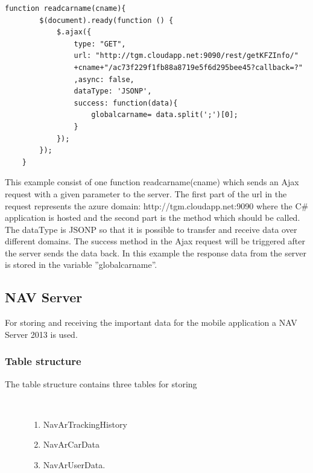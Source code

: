 \begin{lstlisting}[language=html, caption=readcarname example,captionpos=b]
function readcarname(cname){
        $(document).ready(function () {
            $.ajax({
                type: "GET",
                url: "http://tgm.cloudapp.net:9090/rest/getKFZInfo/"
                +cname+"/ac73f229f1fb88a8719e5f6d295bee45?callback=?"
                ,async: false,
                dataType: 'JSONP',
                success: function(data){
                    globalcarname= data.split(';')[0];
                }
            });
        });
    }
\end{lstlisting}
This example consist of one function readcarname(cname) which sends an Ajax request with a given parameter to the server. The first part of the url in the request represents the azure domain: http://tgm.cloudapp.net:9090 where the C\# application is hosted and the second part is the method which should be called. The dataType is JSONP so that it is possible to transfer and receive data over different domains. The success method in the Ajax request will be triggered after the server sends the data back. In this example the response data from the server is stored in the variable ''globalcarname''.
\newpage
\subsection{NAV Server}
For storing and receiving the important data for the mobile application a NAV Server 2013 is used.
\subsubsection{Table structure}
\begin{description}
   \item[The table structure contains three tables for storing]~\par
   \begin{enumerate}
      \item NavArTrackingHistory 
      \item NavArCarData
      \item	NavArUserData. 
   \end{enumerate}
\end{description}

